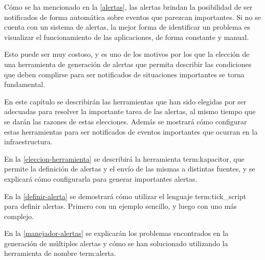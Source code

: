 Cómo se ha mencionado en la \autoref{alertas}, las alertas brindan la
posibilidad de ser notificados de forma automática sobre eventos que 
parezcan importantes. Si no se cuenta con un sistema de alertas, la mejor forma
de identificar un problema es visualizar el funcionamiento de las aplicaciones,
de forma constante y manual.

Esto puede ser muy costoso, y es uno de los motivos por los que la elección de
una herramienta de generación de alertas que permita describir las
condiciones que deben complirse para ser notificados de situaciones importantes
se torna fundamental.

En este capítulo se describirán las herramientas que han sido elegidas por ser
adecuadas para resolver la importante tarea de las alertas, al mismo tiempo que
se darán las razones de estas elecciones. Además se mostrará cómo configurar
estas herramientas para ser notificados de eventos importantes que ocurran en
la infraestructura.

En la \autoref{eleccion-herramienta} se describirá la herramienta
\gls{term:kapacitor}, que permite la definición de alertas y el envío de las
mismas a distintas fuentes, y se explicará cómo configurarla para generar
importantes alertas.

En la \autoref{definir-alerta} se demostrará cómo utilizar el lenguaje
\gls{term:tick_script} para definir alertas. Primero con un ejemplo sencillo, y
luego con uno más complejo.

En la \autoref{manejador-alertas} se explicarán los problemas encontrados en la
generación de múltiples alertas y cómo se han solucionado utilizando la
herramienta de nombre \gls{term:alerta}.
